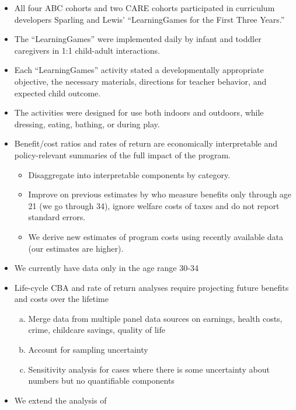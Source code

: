 \documentclass[static]{JJH-Beamer}
\begin{document}
\begin{itemize}
\item All four ABC cohorts and two CARE cohorts participated in curriculum developers Sparling and Lewis' ``LearningGames for the First Three Years.''
\item The ``LearningGames'' were implemented daily by infant and toddler caregivers in 1:1 child-adult interactions.
\item Each ``LearningGames'' activity stated a developmentally appropriate objective, the necessary materials, directions for teacher behavior, and expected child outcome.
\item The activities were designed for use both indoors and outdoors, while dressing, eating, bathing, or during play.
\item Benefit/cost ratios and rates of return are economically interpretable and policy-relevant summaries of the full impact of the program.
    \begin{itemize}
    \item Disaggregate into interpretable components by category.
    \item Improve on previous estimates by \citet{Barnett_Masse_2007_EER} who measure benefits only through age 21 (we go through 34), ignore welfare costs of taxes and do not report standard errors.
    \item We derive new estimates of program costs using recently available data (our estimates are higher).
    \end{itemize}
\item We currently have data only in the age range 30-34
\item Life-cycle CBA and rate of return analyses require projecting future benefits and costs over the lifetime
    \begin{enumerate}[(a)]
    \item Merge data from multiple panel data sources on earnings, health costs, crime, childcare savings, quality of life
    \item Account for sampling uncertainty
    \item Sensitivity analysis for cases where there is some uncertainty about numbers but no quantifiable components
    \end{enumerate}
\item We extend the analysis of \cite{Heckman_Moon_etal_2010_QE}
\end{itemize}

\end{document}
